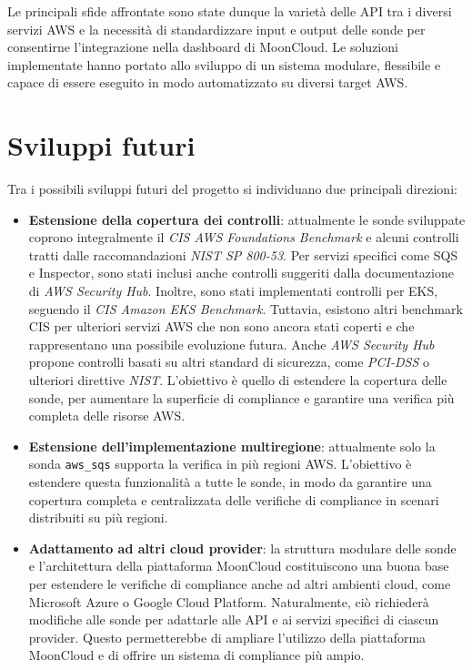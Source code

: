 Le principali sfide affrontate sono state dunque la varietà delle API tra i diversi servizi AWS e la necessità di standardizzare input e output delle sonde per consentirne l'integrazione nella dashboard di MoonCloud. Le soluzioni implementate hanno portato allo sviluppo di un sistema modulare, flessibile e capace di essere eseguito in modo automatizzato su diversi target AWS.

\section{Sviluppi futuri}
\label{sec:sviluppi_futuri}

Tra i possibili sviluppi futuri del progetto si individuano due principali direzioni:

\begin{itemize}
  \item \textbf{Estensione della copertura dei controlli}: attualmente le sonde sviluppate coprono integralmente il \emph{CIS AWS Foundations Benchmark} e alcuni controlli tratti dalle raccomandazioni \emph{NIST SP 800-53}. Per servizi specifici come SQS e Inspector, sono stati inclusi anche controlli suggeriti dalla documentazione di \emph{AWS Security Hub}. Inoltre, sono stati implementati controlli per EKS, seguendo il \emph{CIS Amazon EKS Benchmark}. Tuttavia, esistono altri benchmark CIS per ulteriori servizi AWS che non sono ancora stati coperti e che rappresentano una possibile evoluzione futura. Anche \emph{AWS Security Hub} propone controlli basati su altri standard di sicurezza, come \emph{PCI-DSS} o ulteriori direttive \emph{NIST}. L'obiettivo è quello di estendere la copertura delle sonde, per aumentare la superficie di compliance e garantire una verifica più completa delle risorse AWS.




  \item \textbf{Estensione dell'implementazione multiregione}: attualmente solo la sonda \texttt{aws\_sqs} supporta la verifica in più regioni AWS. L'obiettivo è estendere questa funzionalità a tutte le sonde, in modo da garantire una copertura completa e centralizzata delle verifiche di compliance in scenari distribuiti su più regioni. 

  \item \textbf{Adattamento ad altri cloud provider}: la struttura modulare delle sonde e l'architettura della piattaforma MoonCloud costituiscono una buona base per estendere le verifiche di compliance anche ad altri ambienti cloud, come Microsoft Azure o Google Cloud Platform. Naturalmente, ciò richiederà modifiche alle sonde per adattarle alle API e ai servizi specifici di ciascun provider. Questo permetterebbe di ampliare l'utilizzo della piattaforma MoonCloud e di offrire un sistema di compliance più ampio.
\end{itemize}

